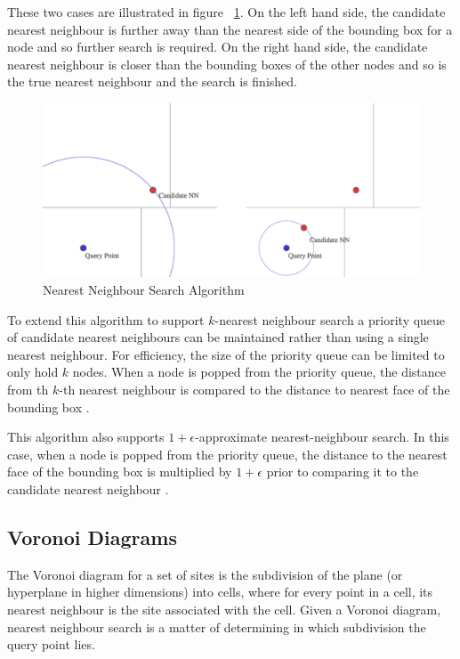 \documentclass[mcs]{scsthesis}
\begin{document}
These two cases are illustrated in figure ~\ref{fig:nn_search}. On the left hand
side, the candidate nearest neighbour is further away than the nearest side of
the bounding box for a node and so further search is required. On the right hand
side, the candidate nearest neighbour is closer than the bounding boxes of the
other nodes and so is the true nearest neighbour and the search is finished.

\begin{figure}
\begin{center}
\includegraphics[scale=0.5]{diagrams/nn_search.eps}
\caption{Nearest Neighbour Search Algorithm}
\label{fig:nn_search}
\end{center}
\end{figure}

To extend this algorithm to support \(k\)-nearest neighbour search a priority
queue of candidate nearest neighbours can be maintained rather than using a
single nearest neighbour. For efficiency, the size of the priority queue can be
limited to only hold \(k\) nodes. When a node is popped from the
priority queue, the distance from th \(k\)-th nearest neighbour is compared to
the distance to nearest face of the bounding box \cite{samet}.

This algorithm also supports \(1 + \epsilon\)-approximate nearest-neighbour
search. In this case, when a node is popped from the priority queue, the
distance to the nearest face of the bounding box is multiplied by
\(1 + \epsilon\) prior to comparing it to the candidate nearest neighbour
\cite{samet}.

\subsection{Voronoi Diagrams}

The Voronoi diagram for a set of sites is the subdivision of the plane (or
hyperplane in higher dimensions) into cells, where for every point in a cell,
its nearest neighbour is the site associated with the cell. Given a Voronoi
diagram, nearest neighbour search is a matter of determining in which
subdivision the query point lies.
\end{document}
